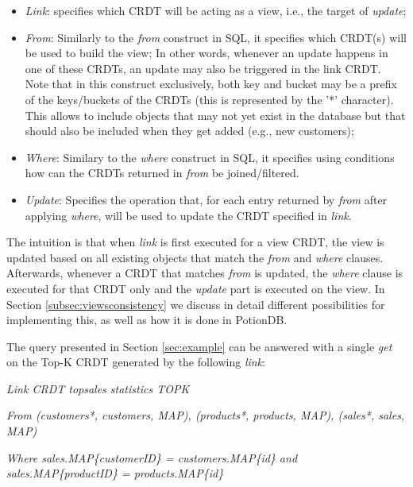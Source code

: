 \documentclass{vldb}
\newcommand{\emphvspace}{0.5\baselineskip}
\newcommand{\firstblockemph}[1]{\vspace{\emphvspace}\hspace{2em}\emph{#1}}
\newcommand{\middleblockemph}[1]{\hspace{2em}\emph{#1}}
\begin{document}
\begin{itemize}
	\item \emph{Link}: specifies which CRDT will be acting as a view, i.e., the target of  \emph{update};
	\item \emph{From}: Similarly to the \emph{from} construct in SQL, it specifies which CRDT(s) will be used to build the view;
	In other words, whenever an update happens in one of these CRDTs, an update may also be triggered in the link CRDT.
	Note that in this construct exclusively, both key and bucket may be a prefix of the keys/buckets of the CRDTs (this is represented by the '*' character).
	This allows to include objects that may not yet exist in the database but that should also be included when they get added (e.g., new customers);
	\item \emph{Where}: Similary to the \emph{where} construct in SQL, it specifies using conditions how can the CRDTs returned in \emph{from} be joined/filtered. %
	\item \emph{Update}: Specifies the operation that, for each entry returned by \emph{from} after applying \emph{where}, will be used to update the CRDT specified in \emph{link}.
\end{itemize}

The intuition is that when \emph{link} is first executed for a view CRDT, the view is updated based on all existing objects that match the \emph{from} and \emph{where} clauses.
Afterwards, whenever a CRDT that matches \emph{from} is updated, the \emph{where} clause is executed for that CRDT only and the \emph{update} part is executed on the view.
In Section \ref{subsec:viewsconsistency} we discuss in detail different possibilities for implementing this, as well as how it is done in PotionDB. %

The query presented in Section \ref{sec:example} can be answered with a single \emph{get} on the Top-K CRDT generated by the following \emph{link}:

\firstblockemph{Link CRDT topsales statistics TOPK}

\middleblockemph{From (customers*, customers, MAP), (products*, products, MAP), (sales*, sales, MAP)}

\middleblockemph{Where sales.MAP\{customerID\} = customers.MAP\{id\} \emph{and}  sales.MAP\{productID\} = products.MAP\{id\}}
\end{document}
